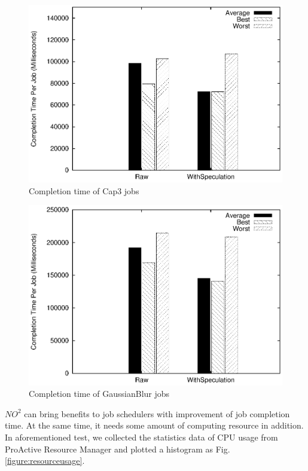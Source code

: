 \begin{figure}
\centering
\includegraphics[width=0.9\columnwidth]{figures/completiontime_cap3.eps}
\caption{Completion time of Cap3 jobs}
\label{figure:completiontime_cap3}
\end{figure}

\begin{figure}
\centering
\includegraphics[width=0.9\columnwidth]{figures/completiontime_gaussianblur.eps}
\caption{Completion time of GaussianBlur jobs}
\label{figure:completiontime_gaussianblur}
\end{figure}

$NO^2$ can bring benefits to job schedulers with improvement of job completion time. At
the same time, it needs some amount of computing resource in addition. In aforementioned
test, we collected the statistics data of CPU usage from ProActive Resource Manager and
plotted a histogram as Fig. \ref{figure:resourceusage}.


